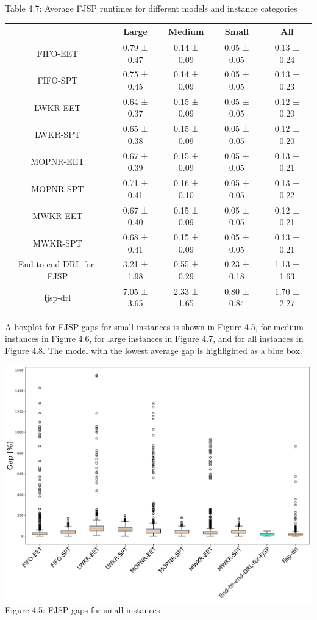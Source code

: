 \begin{table}
    Table 4.7: Average FJSP runtimes for different models and instance categories\\
    \vspace{1mm}
    \label{table:4.5}
    \footnotesize 
    \begin{tabular}{ccccc}
        \toprule
        & Large & Medium & Small & All \\
        \midrule
        FIFO-EET & 0.79 ± 0.47 & 0.14 ± 0.09 & 0.05 ± 0.05 & 0.13 ± 0.24 \\
        FIFO-SPT & 0.75 ± 0.45 & 0.14 ± 0.09 & 0.05 ± 0.05 & 0.13 ± 0.23 \\
        LWKR-EET & 0.64 ± 0.37 & 0.15 ± 0.09 & 0.05 ± 0.05 & 0.12 ± 0.20 \\
        LWKR-SPT & 0.65 ± 0.38 & 0.15 ± 0.09 & 0.05 ± 0.05 & 0.12 ± 0.20 \\
        MOPNR-EET & 0.67 ± 0.39 & 0.15 ± 0.09 & 0.05 ± 0.05 & 0.13 ± 0.21 \\
        MOPNR-SPT & 0.71 ± 0.41 & 0.16 ± 0.10 & 0.05 ± 0.05 & 0.13 ± 0.22 \\
        MWKR-EET & 0.67 ± 0.40 & 0.15 ± 0.09 & 0.05 ± 0.05 & 0.12 ± 0.21 \\
        MWKR-SPT & 0.68 ± 0.41 & 0.15 ± 0.09 & 0.05 ± 0.05 & 0.13 ± 0.21 \\
        End-to-end-DRL-for-FJSP & 3.21 ± 1.98 & 0.55 ± 0.29 & 0.23 ± 0.18 & 1.13 ± 1.63 \\
        fjsp-drl & 7.05 ± 3.65 & 2.33 ± 1.65 & 0.80 ± 0.84 & 1.70 ± 2.27 \\
        \bottomrule
    \end{tabular}
\end{table}


A boxplot for FJSP gaps for small instances is shown in Figure 4.5, for medium instances in Figure 4.6, for large instances in Figure 4.7, and for all instances in Figure 4.8. The model with the lowest average gap is highlighted as a blue box.

\begin{center}
    \includegraphics[width=0.9\linewidth]{images/horizontal_boxplot_fjsp_small.pdf}\\
    Figure 4.5: FJSP gaps for small instances
\end{center}

